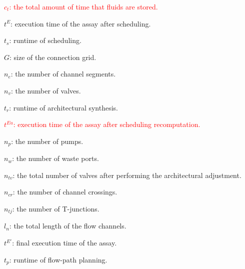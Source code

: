 \begin{table*}[ht]
\begin{threeparttable}[t]
    \label{tb_test}%
    \begin{tablenotes}\footnotesize
     \item \textcolor{red}{$c_t$: the total amount of time that fluids are stored.}
     \item $t^E$: execution time of the assay after scheduling.
      \item $t_s$: runtime of scheduling.
      \item $G$: size of the connection grid.
      \item $n_e$: the number of channel segments.
      \item $n_v$: the number of valves.
      \item $t_r$: runtime of architectural synthesis.
      \item \textcolor{red}{$t^{Eu}$: execution time of the assay after scheduling recomputation.}
      \item $n_{p}$: the number of pumps.
      \item $n_{w}$: the number of waste ports.
      \item $n_{tv}$: the total number of valves after performing the architectural adjustment.
      \item $n_{cr}$: the number of channel crossings.
      \item $n_{tj}$: the number of T-junctions.
      \item $l_n$: the total length of the flow channels.
      \item $t^{E'}$: final execution time of the assay.
      \item $t_p$: runtime of flow-path planning.


    \end{tablenotes}

  \end{threeparttable}
\end{table*}%



